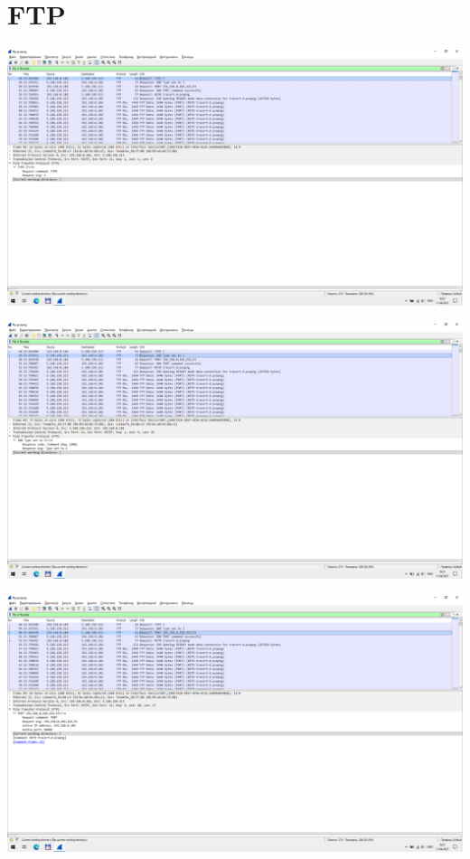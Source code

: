 
\section{FTP}

\includegraphics[width=\textwidth]{screenshots/ftp_type_I_request_1}

\includegraphics[width=\textwidth]{screenshots/ftp_type_I_response_1}

\includegraphics[width=\textwidth]{screenshots/ftp_port_request_1}

